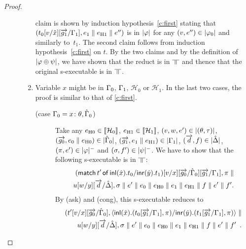 \begin{proof}
\begin{description}
\begin{enumerate}[label=\textit{(\arabic{*})}]
              claim is shown by induction hypothesis~\ref{c:first}
              stating that $(t_0[v/\hat{x}][\overrightarrow{g_1}/\Gamma_1], {e_1\parallel e_{\mathrm{H1}}}\parallel
              e'')$ is in $|{\varphi}|$ for any $(v,e'')\in|{\varphi_0}|$
              and similarly to~$t_1$.
              The second claim follows from induction
              hypothesis~\ref{c:first} on $t$.
              By the two claims and by the definition of
              $|{\varphi\oplus\psi}|$,
              we have shown that the reduct is in $\bbot$ and
              thence that the original s-executable is in $\bbot$.
        \item Variable $x$ might be in $\Gamma_0$, $\Gamma_1$,
	       $\mathcal H_0$ or $\mathcal H_1$.
	       In the last two cases, the proof is similar to that of
	       \ref{c:first}.
              \begin{description}
               \item[(case $\Gamma_0 = {x} \colon{\theta},\hat{\Gamma}_0$)]
                    Take any
		    $e_{\mathrm{H0}}\in\llbracket{\mathcal H_0}\rrbracket$,
		    $e_{\mathrm{H1}}\in\llbracket{\mathcal H_1}\rrbracket$,
                    $(v,w,e')\in|{(\theta,\tau)}|$,
                    $(\overrightarrow{g_0},{e_0\parallel e_{\mathrm{H0}}})\in|{\hat{\Gamma}_0}|$,
                    $(\overrightarrow{g_1},{e_1\parallel e_{\mathrm{H1}}})\in|{\Gamma_1}|$,
                    $(\overrightarrow d, f)\in|{\hat{\Delta}}|$,
                    $(\pi,e')\in|{\varphi}|^-$ and
                    $(\sigma,f')\in|{\psi}|^-$.
                    We have to show that the following s-executable is in
                    $\bbot$:
                    \begin{eqnarray*}
                    (\mathsf{match}\,{t'}\,\mathsf{of}\, \mathsf{inl}({\hat x}). {t_0}/ \mathsf{inr}({\hat
                    y}). {t_1})[v/x][\overrightarrow{g_0}/\hat{\Gamma}_0][\overrightarrow{g_1}/\Gamma_1],\pi\parallel\\
                    u[w/y][\overrightarrow d/\hat{\Delta}],\sigma\parallel e'\parallel
                    {e_0\parallel e_{\mathrm{H0}}}\parallel {e_1\parallel e_{\mathrm{H1}}}\parallel  f\parallel e'\parallel
                    f'.
                    \end{eqnarray*}
                    By (ask) and (cong), this s-executable reduces to
                    \begin{eqnarray*}
                    (t'[v/x][\overrightarrow{g_0}/\hat{\Gamma}_0],
                     \langle \mathsf{inl}({\hat x}). ({t_0[\overrightarrow{g_1}/\Gamma_1]},{\pi})/ \mathsf{inr}({\hat y}). ({t_1[\overrightarrow{g_1}/\Gamma_1]},{\pi})\rangle
                     \parallel\\
                    u[w/y][\overrightarrow d/\hat{\Delta}],\sigma\parallel e'\parallel
                    {e_0\parallel e_{\mathrm{H0}}}\parallel {e_1\parallel e_{\mathrm{H1}}}\parallel  f\parallel e'\parallel
                    f'\enspace.
                    \end{eqnarray*}

\end{description}
\end{enumerate}
\end{description}
\end{proof}

